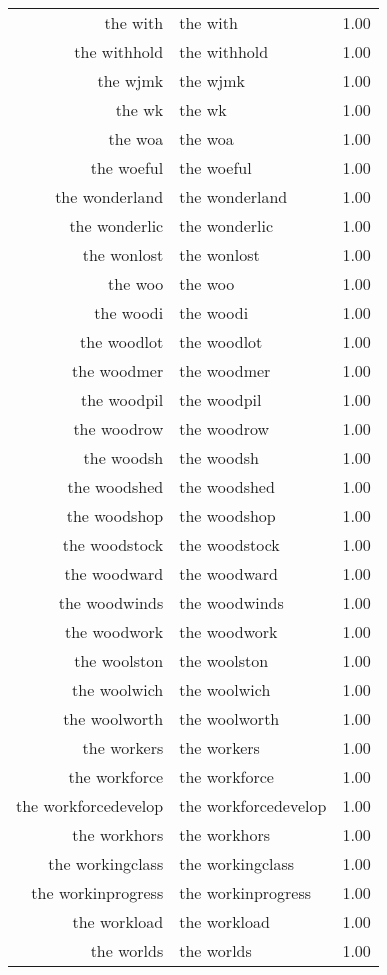 \begin{table}[ht]
\begin{tabular}{rlr}
  the with & the with & 1.00 \\ 
  the withhold & the withhold & 1.00 \\ 
  the wjmk & the wjmk & 1.00 \\ 
  the wk & the wk & 1.00 \\ 
  the woa & the woa & 1.00 \\ 
  the woeful & the woeful & 1.00 \\ 
  the wonderland & the wonderland & 1.00 \\ 
  the wonderlic & the wonderlic & 1.00 \\ 
  the wonlost & the wonlost & 1.00 \\ 
  the woo & the woo & 1.00 \\ 
  the woodi & the woodi & 1.00 \\ 
  the woodlot & the woodlot & 1.00 \\ 
  the woodmer & the woodmer & 1.00 \\ 
  the woodpil & the woodpil & 1.00 \\ 
  the woodrow & the woodrow & 1.00 \\ 
  the woodsh & the woodsh & 1.00 \\ 
  the woodshed & the woodshed & 1.00 \\ 
  the woodshop & the woodshop & 1.00 \\ 
  the woodstock & the woodstock & 1.00 \\ 
  the woodward & the woodward & 1.00 \\ 
  the woodwinds & the woodwinds & 1.00 \\ 
  the woodwork & the woodwork & 1.00 \\ 
  the woolston & the woolston & 1.00 \\ 
  the woolwich & the woolwich & 1.00 \\ 
  the woolworth & the woolworth & 1.00 \\ 
  the workers & the workers & 1.00 \\ 
  the workforce & the workforce & 1.00 \\ 
  the workforcedevelop & the workforcedevelop & 1.00 \\ 
  the workhors & the workhors & 1.00 \\ 
  the workingclass & the workingclass & 1.00 \\ 
  the workinprogress & the workinprogress & 1.00 \\ 
  the workload & the workload & 1.00 \\ 
  the worlds & the worlds & 1.00 \\ 

\end{tabular}
\end{table}
